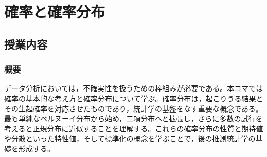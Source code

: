 \section{確率と確率分布}
\label{b10_Probability}

\subsection{授業内容}
\subsubsection{概要}
データ分析においては，不確実性を扱うための枠組みが必要である。本コマでは確率の基本的な考え方と確率分布について学ぶ。確率分布は，起こりうる結果とその生起確率を対応させたものであり，統計学の基盤をなす重要な概念である。最も単純なベルヌーイ分布から始め，二項分布へと拡張し，さらに多数の試行を考えると正規分布に近似することを理解する。これらの確率分布の性質と期待値や分散といった特性値，そして標準化の概念を学ぶことで，後の推測統計学の基礎を形成する。

